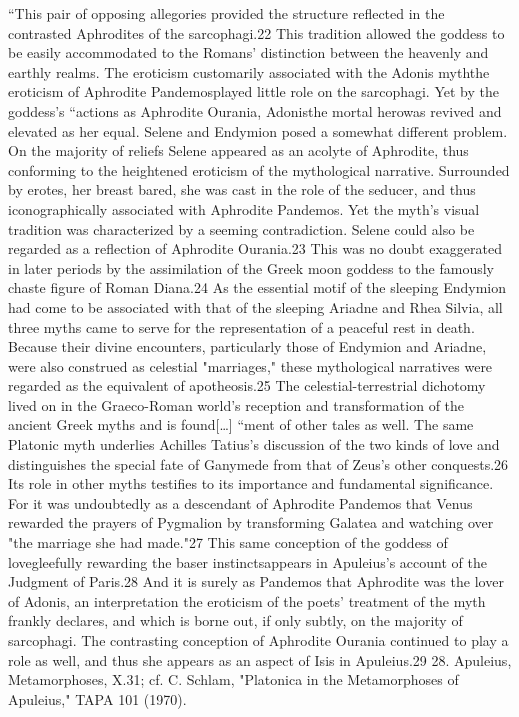 \documentclass[12pt,a4paper,openright, oneside]{book}
\begin{document}
“This pair of opposing allegories provided the structure reflected in the contrasted Aphrodites of the sarcophagi.22 This tradition allowed the goddess to be easily accommodated to the Romans' distinction between the heavenly and earthly realms. The eroticism customarily associated with the Adonis myththe eroticism of Aphrodite Pandemosplayed little role on the sarcophagi. Yet by the goddess's “actions as Aphrodite Ourania, Adonisthe mortal herowas revived and elevated as her equal.	
Selene and Endymion posed a somewhat different problem. On the majority of reliefs Selene appeared as an acolyte of Aphrodite, thus conforming to the heightened eroticism of the mythological narrative. Surrounded by erotes, her breast bared, she was cast in the role of the seducer, and thus iconographically associated with Aphrodite Pandemos.	
Yet the myth's visual tradition was characterized by a seeming contradiction. Selene could also be regarded as a reflection of Aphrodite Ourania.23 This was no doubt exaggerated in later periods by the assimilation of the Greek moon goddess to the famously chaste figure of Roman Diana.24 As the essential motif of the sleeping Endymion had come to be associated with that of the sleeping Ariadne and Rhea Silvia, all three myths came to serve for the representation of a peaceful rest in death. Because their divine encounters, particularly those of Endymion and Ariadne, were also construed as celestial "marriages," these mythological narratives were regarded as the equivalent of apotheosis.25	
The celestial-terrestrial dichotomy lived on in the Graeco-Roman world's reception and transformation of the ancient Greek myths and is found[…]  “ment of other tales as well. The same Platonic myth underlies Achilles Tatius's discussion of the two kinds of love and distinguishes the special fate of Ganymede from that of Zeus's other conquests.26 Its role in other myths testifies to its importance and fundamental significance. For it was undoubtedly as a descendant of Aphrodite Pandemos that Venus rewarded the prayers of Pygmalion by transforming Galatea and watching over "the marriage she had made."27 This same conception of the goddess of lovegleefully rewarding the baser instinctsappears in Apuleius's account of the Judgment of Paris.28 And it is surely as Pandemos that Aphrodite was the lover of Adonis, an interpretation the eroticism of the poets' treatment of the myth frankly declares, and which is borne out, if only subtly, on the majority of sarcophagi. The contrasting conception of Aphrodite Ourania continued to play a role as well, and thus she appears as an aspect of Isis in Apuleius.29
28. Apuleius, Metamorphoses, X.31; cf. C. Schlam, "Platonica in the Metamorphoses of Apuleius," TAPA 101 (1970).	
		
\end{document}
